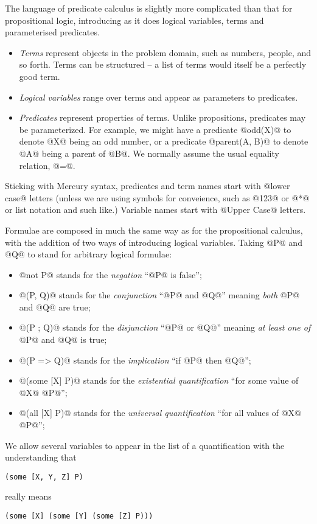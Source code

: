 \begin{itemize}
The language of predicate calculus is slightly more complicated than
that for propositional logic, introducing as it does logical variables,
terms and parameterised predicates.
\begin{itemize}
\item \emph{Terms} represent objects in the problem domain, such as
numbers, people, and so forth.  Terms can be structured -- a list of
terms would itself be a perfectly good term.
\item \emph{Logical variables} range over terms and appear as parameters
to predicates.
\item \emph{Predicates} represent properties of terms.  Unlike
propositions, predicates may be parameterized.  For example, we might
have a predicate @odd(X)@ to denote @X@ being an odd number, or a
predicate @parent(A, B)@ to denote @A@ being a parent of @B@.  We
normally assume the usual equality relation, @=@.
\end{itemize}
Sticking with Mercury syntax, predicates and term names start with
@lower case@ letters (unless we are using symbols for conveience, such
as @123@ or @*@ or list notation and such like.)  Variable names start
with @Upper Case@ letters.

Formulae are composed in much the same way as for the propositional
calculus, with the addition of two ways of introducing logical
variables.  Taking @P@ and @Q@ to stand for arbitrary logical formulae:
\begin{itemize}
\item @not P@ stands for the \emph{negation} ``@P@ is false'';
\item @(P, Q)@ stands for the \emph{conjunction} ``@P@ and @Q@'' meaning
\emph{both} @P@ and @Q@ are true;
\item @(P ; Q)@ stands for the \emph{disjunction} ``@P@ or @Q@'' meaning
\emph{at least one of} @P@ and @Q@ is true;
\item @(P => Q)@ stands for the \emph{implication} ``if @P@ then @Q@'';
\item @(some [X] P)@ stands for the \emph{existential
quantification} ``for some value of @X@ @P@'';
\item @(all [X] P)@ stands for the \emph{universal
quantification} ``for all values of @X@ @P@'';
\end{itemize}

We allow several variables to appear in the list of a quantification
with the understanding that
\begin{verbatim}
(some [X, Y, Z] P)
\end{verbatim}
really means
\begin{verbatim}
(some [X] (some [Y] (some [Z] P)))
\end{verbatim}


\end{itemize}
